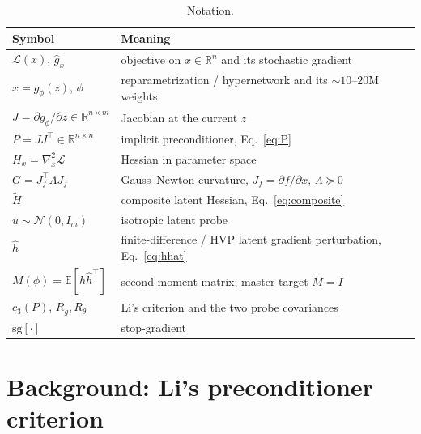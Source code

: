 \documentclass[11pt]{article}
\theoremstyle{plain}
\theoremstyle{definition}
\theoremstyle{remark}
\newcommand{\R}{\mathbb{R}}
\newcommand{\E}{\mathbb{E}}
\newcommand{\N}{\mathcal{N}}
\newcommand{\Loss}{\mathcal{L}}
\newcommand{\sg}{\mathrm{sg}}
\newcommand{\tHess}{\tilde{H}}
\newcommand{\hh}{\hat{h}}
\begin{document}
\begin{table}[t]
\centering
\small
\begin{tabular}{@{}ll@{}}
\toprule
Symbol & Meaning\\
\midrule
$\Loss(x)$, $\hat g_x$ & objective on $x\in\R^n$ and its stochastic gradient\\
$x=g_\phi(z)$, $\phi$ & reparametrization / hypernetwork and its $\sim\!10$--$20$M weights\\
$J=\partial g_\phi/\partial z\in\R^{n\times m}$ & Jacobian at the current $z$\\
$P=JJ^{\!\top}\in\R^{n\times n}$ & implicit preconditioner, Eq.~\eqref{eq:P}\\
$H_x=\nabla^2_x\Loss$ & Hessian in parameter space\\
$G=J_f^{\!\top}\Lambda J_f$ & Gauss--Newton curvature, $J_f=\partial f/\partial x$, $\Lambda\succeq0$\\
$\tHess$ & composite latent Hessian, Eq.~\eqref{eq:composite}\\
$u\sim\N(0,I_m)$ & isotropic latent probe\\
$\hh$ & finite-difference / HVP latent gradient perturbation, Eq.~\eqref{eq:hhat}\\
$M(\phi)=\E[\hh\hh^{\!\top}]$ & second-moment matrix; master target $M=I$\\
$c_3(P)$, $R_g,R_\theta$ & Li's criterion and the two probe covariances\\
$\sg[\cdot]$ & stop-gradient\\
\bottomrule
\end{tabular}
\caption{Notation.}
\label{tab:notation}
\end{table}

\section{Background: Li's preconditioner criterion}
\label{sec:li}
\end{document}
